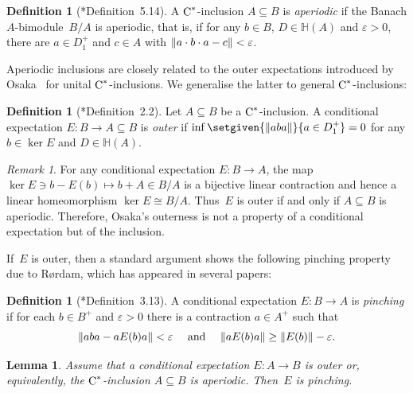 \documentclass[a4paper]{amsart}
\theoremstyle{plain}
\newtheorem{lemma}[theorem]{Lemma}
\theoremstyle{definition}
\newtheorem{definition}[theorem]{Definition}
\theoremstyle{remark}
\newtheorem{remark}[theorem]{Remark}
\numberwithin{theorem}{section}
\numberwithin{equation}{section}
\newcommand{\Her}{\mathbb H}%
\newcommand*{\nb}{\nobreakdash}
\newcommand*{\Cst}{\textup C^*}%
\DeclarePairedDelimiter{\norm}{\lVert}{\rVert}%
\begin{document}
\begin{definition}[\cite{Kwasniewski-Meyer:Essential}*{Definition~5.14}]
  A \(\Cst\)\nb-inclusion \(A\subseteq B\) is \emph{aperiodic} if the
  Banach \(A\)\nb-bimodule~\(B/A\) is aperiodic, that is, if for any
  \(b\in B\), \(D\in \Her(A)\) and \(\varepsilon>0\), there are \(a\in
  D^+_1\) and \(c\in A\) with \(\norm{a \cdot b\cdot a
    -c}<\varepsilon\).
\end{definition}

Aperiodic inclusions are closely related to the outer expectations
introduced by Osaka~\cite{Osaka:SP_property} for unital
\(\Cst\)\nb-inclusions.
We generalise the latter to general \(\Cst\)\nb-inclusions:

\begin{definition}[\cite{Osaka:SP_property}*{Definition~2.2}]
  Let \(A\subseteq B\) be a \(\Cst\)\nb-inclusion.
  A conditional expectation \(E\colon B\to A\subseteq B\) is
  \emph{outer} if \(\inf\setgiven{\norm{aba}}{a\in D^+_1}=0\) for
  any \(b\in \ker E\) and \(D\in \Her(A)\).
\end{definition}

\begin{remark}
  \label{rem:outer_expectation_means_aperiodic}
  For any conditional expectation \(E\colon B\to A\), the map \(\ker E
  \ni b-E(b) \mapsto b+A \in B/A\) is a bijective linear contraction
  and hence a linear homeomorphism \(\ker E\cong B/A\).
  Thus~\(E\) is outer if and only if \(A\subseteq B\) is aperiodic.
  Therefore, Osaka's outerness is not a property of a conditional
  expectation but of the inclusion.
\end{remark}

If~\(E\) is outer, then a standard argument shows the following
pinching property due to Rørdam, which has appeared in several
papers:

\begin{definition}[\cite{Rordam:Irreducible_inclusions}*{Definition~3.13}]
  A conditional expectation \(E\colon B\to A\) is \emph{pinching} if
  for each \(b\in B^+\) and \(\varepsilon >0\) there is a contraction
  \(a\in A^+\) such that
  \[
    \norm{ab a- aE(b)a}<\varepsilon
    \quad\text{ and }\quad
    \norm{aE(b)a}\ge \norm{E(b)}- \varepsilon.
  \]
\end{definition}

\begin{lemma}
  \label{lem:aperiodic_implies_pinching}
  Assume that a conditional expectation \(E\colon A\to B\) is outer
  or, equivalently, the \(\Cst\)\nb-inclusion \(A\subseteq B\) is
  aperiodic.
  Then~\(E\) is pinching.
\end{lemma}
\end{document}
